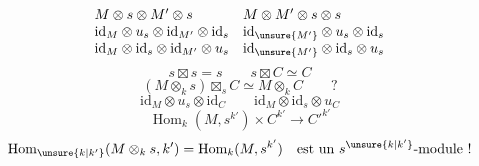 \[
\begin{array}{ll}
M\otimes s\otimes M'\otimes s & M\otimes M'\otimes s\otimes s\\
\mathrm{id}_M\otimes u_s\otimes\mathrm{id}_{M'}\otimes\mathrm{id}_s & \mathrm{id}_{\unsure{M'}}\otimes u_s\otimes\mathrm{id}_s\\
\mathrm{id}_M\otimes\mathrm{id}_s\otimes\mathrm{id}_{M'}\otimes u_s & \mathrm{id}_{\unsure{M'}}\otimes\mathrm{id}_s\otimes u_s
\end{array}
\]
\[
s\boxtimes s=s\qquad s\boxtimes C\simeq C
\]
\[
\boxed{(M\otimes_k s)\boxtimes_s C\simeq M\otimes_k C}\qquad ?
\]
\[
\mathrm{id}_M\otimes u_s\otimes\mathrm{id}_C
\qquad
\mathrm{id}_M\otimes\mathrm{id}_s\otimes u_C
\]
\[
\operatorname{Hom}_k(M,s^{k'})\times C^{k'}\longrightarrow C'^{k'}
\]
\[
\operatorname{Hom}_{\unsure{k|k'}}(M\otimes_k s,k')=\operatorname{Hom}_k(M,s^{k'})
\quad\text{est un }s^{\unsure{k|k'}}\text{-module !}
\]
